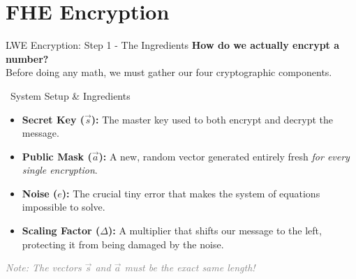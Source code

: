 \documentclass[aspectratio=169, 10pt]{beamer}
\begin{document}
\section{FHE Encryption}
\begin{frame}{LWE Encryption: Step 1 - The Ingredients}
    \Large
    \textbf{How do we actually encrypt a number?} \\
    \vspace{0.2cm}
    \normalsize
    Before doing any math, we must gather our four cryptographic components.
    \vspace{0.4cm}
    
    \begin{block}{\faList \ System Setup \& Ingredients}
        \begin{itemize}
            \item \textbf{Secret Key ($\vec{s}$):} The master key used to both encrypt and decrypt the message.
            \item \textbf{Public Mask ($\vec{a}$):} A new, random vector generated entirely fresh \textit{for every single encryption}.
            \item \textbf{Noise ($e$):} The crucial tiny error that makes the system of equations impossible to solve.
            \item \textbf{Scaling Factor ($\Delta$):} A multiplier that shifts our message to the left, protecting it from being damaged by the noise.
        \end{itemize}
    \end{block}
    \vspace{0.2cm}
    \begin{center}
        \textit{\textcolor{gray}{Note: The vectors $\vec{s}$ and $\vec{a}$ must be the exact same length!}}
    \end{center}
\end{frame}
\end{document}
